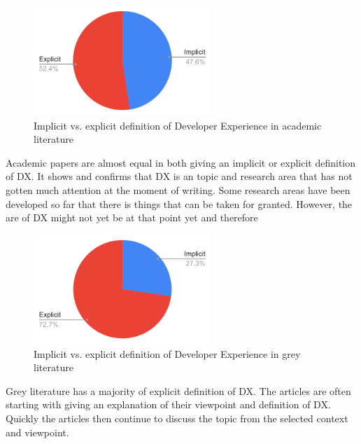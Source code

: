 \documentclass[english, 12pt, a4paper, sci, utf8, a-1b, online]{aaltothesis}
\begin{document}
\begin{figure}[H]
  \captionsetup{width=0.6\textwidth}
  \caption{Implicit vs. explicit definition of Developer Experience in academic literature}
  \begin{center}
    \includegraphics[width=0.6\textwidth]{definition-academic.pdf}
  \end{center}
\end{figure}

Academic papers are almost equal in both giving an implicit or explicit definition of DX. It shows and confirms that DX is an topic and research area that has not gotten much attention at the moment of writing. Some research areas have been developed so far that there is things that can be taken for granted. However, the are of DX might not yet be at that point yet and therefore

\begin{figure}[H]
  \captionsetup{width=0.6\textwidth}
  \begin{center}
    \caption{Implicit vs. explicit definition of Developer Experience in grey literature}
    \includegraphics[width=0.6\textwidth]{definition-grey.pdf}
  \end{center}
\end{figure}

Grey literature has a majority of explicit definition of DX. The articles are often starting with giving an explanation of their viewpoint and definition of DX. Quickly the articles then continue to discuss the topic from the selected context and viewpoint.
\end{document}
